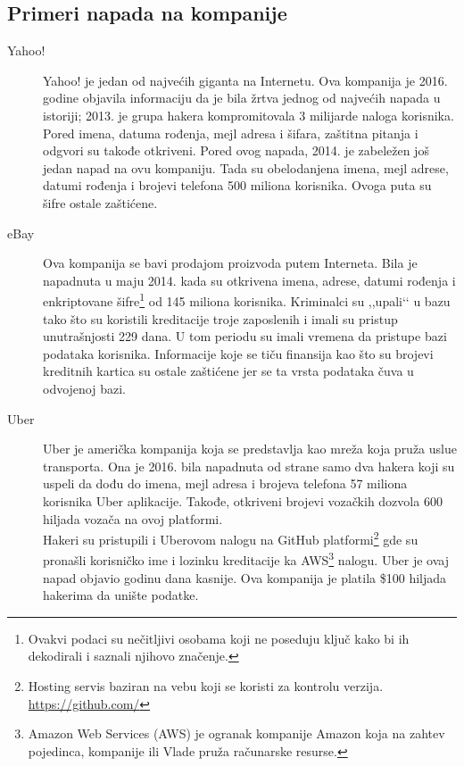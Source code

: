 \documentclass[a4paper]{article}
\theoremstyle{break}
\begin{document}
{\begin{description}
\end{description}


\subsection{Primeri napada na kompanije}
\label{subsec:primeri_napada_kompanije}


\begin{description}
\item [Yahoo!] Yahoo! je jedan od najvećih giganta na Internetu. Ova kompanija je 2016. godine objavila informaciju da je bila žrtva jednog od najvećih napada u istoriji; 2013. je grupa hakera kompromitovala 3 milijarde naloga korisnika. Pored imena, datuma rođenja, mejl adresa i šifara, zaštitna pitanja i odgvori su takođe otkriveni. 
Pored ovog napada, 2014. je zabeležen još jedan napad na ovu kompaniju. Tada su obelodanjena imena, mejl adrese, datumi rođenja i brojevi telefona 500 miliona korisnika. Ovoga puta su šifre ostale zaštićene. 
\item [eBay] Ova kompanija se bavi prodajom proizvoda putem Interneta. Bila je napadnuta u maju 2014. kada su otkrivena imena, adrese, datumi rođenja i enkriptovane šifre\footnote{Ovakvi podaci su nečitljivi osobama koji ne poseduju ključ kako bi ih dekodirali i saznali njihovo značenje.} od 145 miliona korisnika. Kriminalci su ,,upali‘‘ u bazu tako što su koristili kreditacije troje zaposlenih i imali su pristup unutrašnjosti 229 dana. U tom periodu su imali vremena da pristupe bazi podataka korisnika. Informacije koje se tiču finansija kao što su brojevi kreditnih kartica su ostale zaštićene jer se ta vrsta podataka čuva u odvojenoj bazi.
\item [Uber] Uber je američka kompanija koja se predstavlja kao mreža koja pruža uslue transporta. Ona je 2016. bila napadnuta od strane samo dva hakera koji su uspeli da dođu do imena, mejl adresa i brojeva telefona 57 miliona korisnika Uber aplikacije. Takođe, otkriveni brojevi vozačkih dozvola 600 hiljada vozača na ovoj platformi.\\Hakeri su pristupili i Uberovom nalogu na GitHub platformi\footnote{Hosting servis baziran na vebu koji se koristi za kontrolu verzija. \url{https://github.com/}} gde su pronašli korisničko ime i lozinku kreditacije ka AWS\footnote{Amazon Web Services (AWS) je ogranak kompanije Amazon koja na zahtev pojedinca, kompanije ili Vlade pruža računarske resurse.} nalogu. 
Uber je ovaj napad objavio godinu dana kasnije. Ova kompanija je platila \$100 hiljada hakerima da unište podatke.  
\end{description}


}
\end{document}
